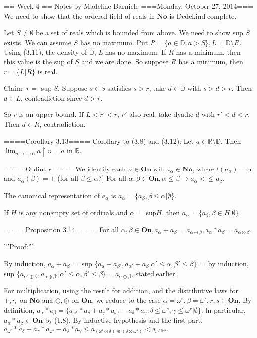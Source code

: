 == Week 4 ==
Notes by Madeline Barnicle
===Monday, October 27, 2014===
We need to show that the ordered field of reals in $\mathbf{No}$ is Dedekind-complete.

Let $S \neq \emptyset$ be a set of reals which is bounded from above. We need to show sup $S$ exists. We can assume $S$ has no maximum. Put $R=\{a \in \mathbb{D}: a>S\}, L=\mathbb{D} \setminus R$. Using (3.11), the density of $\mathbb{D}$, $L$ has no maximum. If $R$ has a minimum, then this value is the sup of $S$ and we are done. So suppose $R$ has a minimum, then $r=\{L|R\}$ is real.

Claim: $r=$ sup $S$. Suppose $s \in S$ satisfies $s>r$, take $d \in \mathbb{D}$ with $s>d>r$. Then $d \in L$, contradiction since $d>r$.

So $r$ is an upper bound. If $L<r'<r$, $r'$ also real, take dyadic $d$ with $r'<d<r$. Then $d \in R$, contradiction.

====Corollary 3.13====
Corollary to (3.8) and (3.12): Let $a \in \mathbb{R} \setminus \mathbb{D}$. Then $\lim_{n \to +\infty} a \restriction n =a$ in $\mathbb{R}$.

====Ordinals====
We identify each $n \in \mathbf{On}$ wih $a_\alpha \in \mathbf{No}$, where $l(a_\alpha)=\alpha$ and $a_{\alpha}(\beta)=+$ (for all $\beta \leq \alpha$?) For all $\alpha, \beta \in \mathbf{On}, \alpha \leq \beta \rightarrow a_\alpha <\leq a_\beta$.

The canonical representation of $a_\alpha$ is $a_\alpha = \{a_{\beta}, \beta \leq \alpha | \emptyset \}$.

If $H$ is any nonempty set of ordinals and $\alpha =$ sup$ H$, then $a_\alpha = \{a_{\beta}, \beta \in H | \emptyset \}$.

====Proposition 3.14====
For all $\alpha, \beta \in \mathbf{On}, a_\alpha + a_\beta = a_{\alpha \oplus \beta}, a_\alpha * a_\beta = a_{\alpha \otimes \beta}$.


'''Proof:'''

By induction, $a_\alpha + a_\beta =$ sup $\{a_\alpha + a_{\beta'}, a_{\alpha'} + a_\beta | \alpha' \leq \alpha, \beta' \leq \beta \}  =$ by induction, sup $\{a_{\alpha' \oplus \beta}, a_{\alpha \oplus \beta'} | \alpha' \leq \alpha, \beta' \leq \beta \} = a_{\alpha \oplus \beta}$, stated earlier.

For multiplication, using the result for addition, and the distributive laws for $+, \centerdot,$ on $\mathbf{No}$ and $\oplus, \otimes$ on $\mathbf{On}$, we reduce to the case $\alpha = \omega^r, \beta= \omega^s, r, s \in \mathbf{On}$. By definition, $a_\alpha * a_\beta = \{a_{\omega^r} * a_\delta + a_{\gamma}*a_{\omega^s} - a_{\delta}*a_{\gamma} : \delta \leq \omega^s, \gamma \leq \omega^r | \emptyset \}.$ In particular, $a_\alpha * a_\beta \in \mathbf{On}$ by (1.8). By inductive hypothesis and the first part, $a_{\omega^r} * a_\delta + a_{\gamma}*a_{\omega^s} - a_{\delta}*a_{\gamma} \leq a_{(\omega^r \otimes \delta) \oplus (\delta \otimes \omega^s)} < a_{\omega^{r \oplus s}}.$

